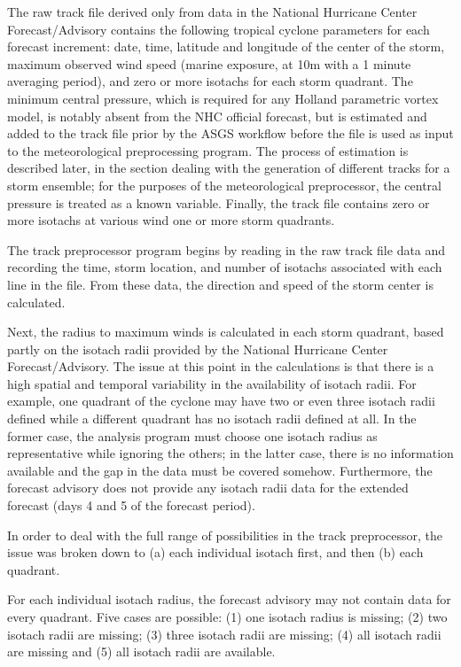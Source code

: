 \documentclass[12pt]{article}
\begin{document}
The raw track file derived only from data in the National Hurricane 
Center Forecast/Advisory contains the following tropical cyclone 
parameters for each forecast increment: date, time, latitude and 
longitude of the center of the storm, maximum observed wind speed 
(marine exposure, at 10m with a 1 minute averaging period), and zero 
or more isotachs for each storm quadrant. The minimum central 
pressure, which is required for any Holland parametric vortex model, 
is notably absent from the NHC official forecast, but is estimated 
and added to the track file prior by the ASGS workflow before the 
file is used as input to the meteorological preprocessing program. 
The process of estimation is described later, in the section dealing 
with the generation of different tracks for a storm ensemble; for 
the purposes of the meteorological preprocessor, the central 
pressure is treated as a known variable. Finally, the track file 
contains zero or more isotachs at various wind one or more storm 
quadrants.

The track preprocessor program begins by reading in the raw track file
data and recording the time, storm location, and number of isotachs
associated with each line in the file. From these data, the direction
and speed of the storm center is calculated.

Next, the radius to maximum winds is calculated in each storm 
quadrant, based partly on the isotach radii provided by the National 
Hurricane Center Forecast/Advisory. The issue at this point in the 
calculations is that there is a high spatial and temporal 
variability in the availability of isotach radii. For example, one 
quadrant of the cyclone may have two or even three isotach radii 
defined while a different quadrant has no isotach radii defined at 
all. In the former case, the analysis program must choose one 
isotach radius as representative while ignoring the others; in the 
latter case, there is no information available and the gap in the 
data must be covered somehow. Furthermore, the forecast advisory
does not provide any isotach radii data for the extended forecast
(days 4 and 5 of the forecast period).

In order to deal with the full range of possibilities in the track 
preprocessor, the issue was broken down to (a) each individual 
isotach first, and then (b) each quadrant. 

For each individual isotach radius, the forecast advisory may not 
contain data for every quadrant. Five cases are possible: (1) one 
isotach radius is missing; (2) two isotach radii are missing; (3) 
three isotach radii are missing; (4) all isotach radii are missing 
and (5) all isotach radii are available. 
\end{document}
